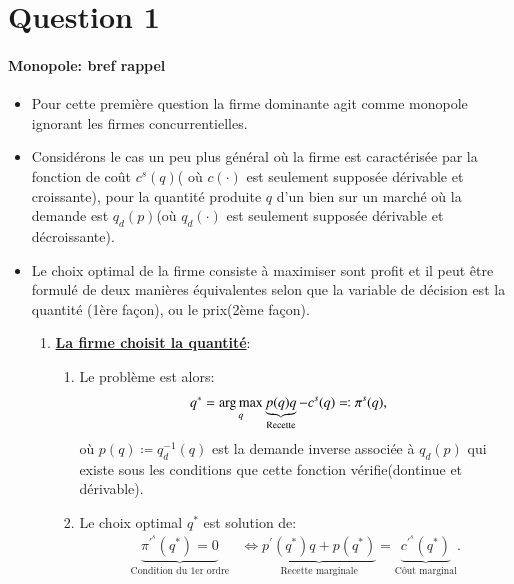 \section{Question 1}
\frame{\sectionpage}
\begin{frame}
  [allowframebreaks]{\insertsection}
  \framesubtitle{Monopole: bref rappel}
  \begin{itemize}
  \item Pour cette première question la firme dominante agit comme monopole ignorant les firmes concurrentielles.
  \item Considérons le cas un peu plus général où la firme est caractérisée par la fonction de coût $c^s(q)$( où $c(\cdot)$ est seulement supposée dérivable et croissante), pour la quantité produite $q$ d'un bien sur un marché où la demande est $q_d(p)$(où $q_d(\cdot)$ est seulement supposée dérivable et décroissante).
  \item Le choix optimal de la firme consiste à maximiser sont profit et il peut être formulé de deux manières équivalentes selon que la variable de décision est la quantité (1ère façon), ou le prix(2ème façon).
  \begin{enumerate}
  \item \textbf{\underline{La firme choisit la quantité}}:
  \begin{enumerate}[$\cdot$]
  \item Le problème est alors:
  \begin{align}
  q^* &= \argmax_{q} \underbrace{p(q)q}_{\text{Recette}} - c^s(q)\eqqcolon \pi^s(q), \label{eq7}
  \end{align}
  où $p(q)\coloneqq q_d^{-1}(q)$ est la demande inverse associée à $q_d(p)$ qui existe sous les conditions que cette fonction vérifie(dontinue et dérivable).
  \item  Le choix optimal $q^*$ est solution de:
  \begin{align}
  \underbrace{\pi^{\prime^s}(q^*) = 0}_{\text{Condition du 1er ordre}} &\Leftrightarrow   \underbrace{p^\prime(q^*) q + p(q^*)}_{\text{Recette marginale}} = \underbrace{c^{\prime^s}(q^*)}_{\text{Côut marginal}}. 
  \label{eq8}
  \end{align}
  \end{enumerate}


\end{enumerate}
\end{itemize}
\end{frame}
